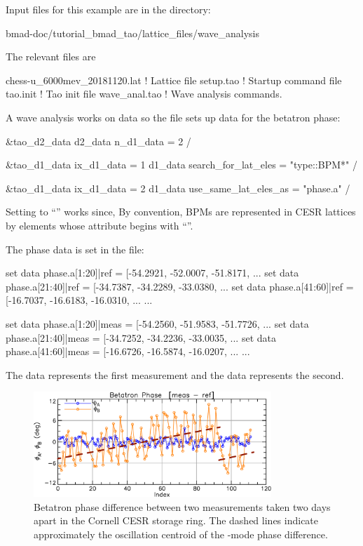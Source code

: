 \documentclass{hitec}     %
\begin{document}
Input files for this example are in the directory:
\begin{code}
bmad-doc/tutorial_bmad_tao/lattice_files/wave_analysis
\end{code}
The relevant files are 
\begin{code}
chess-u_6000mev_20181120.lat    ! Lattice file
setup.tao                       ! Startup command file
tao.init                        ! Tao init file
wave_anal.tao                   ! Wave analysis commands.
\end{code}

A wave analysis works on data so the  file sets up data for the betatron phase:
\begin{code}
&tao_d2_data
  d2_data%
  n_d1_data = 2
/

&tao_d1_data
  ix_d1_data = 1
  d1_data%
  search_for_lat_eles = "type::BPM*"
/

&tao_d1_data
  ix_d1_data = 2
  d1_data%
  use_same_lat_eles_as = "phase.a"
/
\end{code}
Setting  to ``'' works since, By convention, BPMs are
represented in CESR lattices by  elements whose  attribute begins with
``''.

The phase data is set in the  file:
\begin{code}
set data phase.a[1:20]|ref = [-54.2921, -52.0007, -51.8171, ...
set data phase.a[21:40]|ref = [-34.7387, -34.2289, -33.0380, ...
set data phase.a[41:60]|ref = [-16.7037, -16.6183, -16.0310, ...
...

set data phase.a[1:20]|meas = [-54.2560, -51.9583, -51.7726, ...
set data phase.a[21:40]|meas = [-34.7252, -34.2236, -33.0035, ...
set data phase.a[41:60]|meas = [-16.6726, -16.5874, -16.0207, ...
...
\end{code}
The  data represents the first measurement and the  data represents the second.

\begin{figure}[tb]
  \centering
  \includegraphics[width=0.8\textwidth]{betatron-phase-diff.pdf}
  \caption{
Betatron phase difference between two measurements taken two days apart in the Cornell CESR storage
ring. The dashed lines indicate approximately the oscillation centroid of the -mode phase difference.
  }
  \label{f:phase.diff}
\end{figure}
\end{document}

